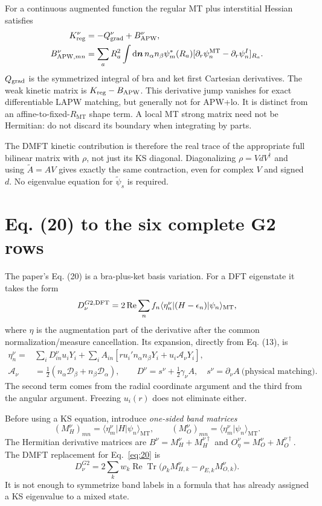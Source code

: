 \documentclass[11pt]{article}
\newcommand{\Tr}{\operatorname{Tr}}
\newcommand{\Rea}{\operatorname{Re}}
\newcommand{\dd}{\mathrm d}
\newcommand{\MT}{\mathrm{MT}}
\begin{document}
For a continuous augmented function the regular MT plus interstitial Hessian satisfies
\begin{align}
 K_{\rm reg}^\nu&=-Q_{\rm grad}^\nu+B_{\rm APW}^\nu,\\
 B_{{\rm APW},mn}^\nu&=\sum_aR_a^2\int\dd\bm n\,n_\alpha n_\beta\psi_m^*(R_a)
 [\partial_r\psi_n^{\MT}-\partial_r\psi_n^I]_{R_a}.
\end{align}
$Q_{\rm grad}$ is the symmetrized integral of bra and ket first Cartesian derivatives. The weak kinetic matrix is $K_{\rm reg}-B_{\rm APW}$. This derivative jump vanishes for exact differentiable LAPW matching, but generally not for APW+lo. It is distinct from an affine-to-fixed-$R_{\MT}$ shape term. A local MT strong matrix need not be Hermitian: do not discard its boundary when integrating by parts.

The DMFT kinetic contribution is therefore the real trace of the appropriate full bilinear matrix with $\rho$, not just its KS diagonal. Diagonalizing $\rho=VdV^\dagger$ and using $\widetilde A=AV$ gives exactly the same contraction, even for complex $V$ and signed $d$. No eigenvalue equation for $\widetilde\psi_s$ is required.

\section{Eq. (20) to the six complete G2 rows}
The paper's Eq. (20) is a bra-plus-ket basis variation. For a DFT eigenstate it takes the form
\begin{equation}\label{eq:20}
 D_\nu^{G2,\rm DFT}=2\Rea\sum_n f_n\langle\eta_n^\nu|(H-\epsilon_n)|\psi_n\rangle_{\MT},
\end{equation}
where $\eta$ is the augmentation part of the derivative after the common normalization/measure cancellation. Its expansion, directly from Eq. (13), is
\begin{align}\label{eq:eta}
 \eta_n^\nu={}&\sum_i D_{in}^\nu u_iY_i
 +\sum_i A_{in}\left[r u_i' n_\alpha n_\beta Y_i
                       +u_i\mathcal A_\nu Y_i\right],\\
 \mathcal A_\nu&=\tfrac12(n_\alpha\mathcal D_\beta+n_\beta\mathcal D_\alpha),\qquad
 D^\nu=s^\nu+\tfrac12\gamma_\nu A,\quad s^\nu=\partial_\nu A\ \text{(physical matching)}.
\end{align}
The second term comes from the radial coordinate argument and the third from the angular argument. Freezing $u_i(r)$ does not eliminate either.

Before using a KS equation, introduce \emph{one-sided band matrices}
\begin{equation}
 (M_H^\nu)_{mn}=\langle\eta_m^\nu|H|\psi_n\rangle_{\MT},\qquad
 (M_O^\nu)_{mn}=\langle\eta_m^\nu|\psi_n\rangle_{\MT}.
\end{equation}
The Hermitian derivative matrices are $B^\nu=M_H^\nu+M_H^{\nu\dagger}$ and
$O_\eta^\nu=M_O^\nu+M_O^{\nu\dagger}$. The DMFT replacement for Eq.~\eqref{eq:20} is
\begin{equation}\label{eq:dmftg2}
 \boxed{D_\nu^{G2}=2\sum_k w_k\Rea\Tr\big(\rho_kM_{H,k}^\nu-\rho_{E,k}M_{O,k}^\nu\big).}
\end{equation}
It is not enough to symmetrize band labels in a formula that has already assigned a KS eigenvalue to a mixed state.
\end{document}

